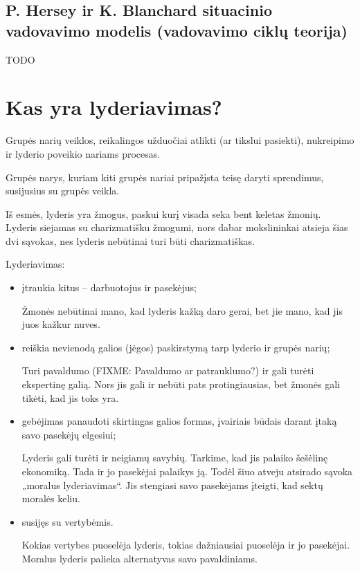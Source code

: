 \subsection{P. Hersey ir K. Blanchard situacinio vadovavimo modelis
(vadovavimo ciklų teorija)}

TODO

\section{Kas yra lyderiavimas?}

\begin{defn}[Lyderiavimas]
  Grupės narių veiklos, reikalingos užduočiai atlikti (ar tikslui pasiekti),
  nukreipimo ir lyderio poveikio nariams procesas.
\end{defn}

\begin{defn}[Lyderis]
  Grupės narys, kuriam kiti grupės nariai pripažįsta teisę daryti
  sprendimus, susijusius su grupės veikla.
\end{defn}

Iš esmės, lyderis yra žmogus, paskui kurį visada seka bent keletas žmonių.
Lyderis siejamas su charizmatišku žmogumi, nors dabar mokslininkai
atsieja šias dvi sąvokas, nes lyderis nebūtinai turi būti charizmatiškas.

Lyderiavimas:
\begin{itemize}
  \item įtraukia kitus – darbuotojus ir pasekėjus;
    \begin{note}
      Žmonės nebūtinai mano, kad lyderis kažką daro gerai, bet jie mano,
      kad jis juos kažkur nuves.
    \end{note}
  \item reiškia nevienodą galios (jėgos) paskirstymą tarp lyderio ir
    grupės narių;
    \begin{note}
      Turi pavaldumo (FIXME: Pavaldumo ar patrauklumo?) ir gali turėti
      ekspertinę galią. Nors jis gali ir nebūti pats protingiausias,
      bet žmonės gali tikėti, kad jis toks yra.
    \end{note}
  \item gebėjimas panaudoti skirtingas galios formas, įvairiais būdais
    darant įtaką savo pasekėjų elgesiui;
    \begin{note}
      Lyderis gali turėti ir neigiamų savybių. Tarkime, kad jis palaiko
      šešėlinę ekonomiką. Tada ir jo pasekėjai palaikys ją. Todėl šiuo
      atveju atsirado sąvoka „moralus lyderiavimas“. Jis stengiasi
      savo pasekėjams įteigti, kad sektų moralės keliu.
    \end{note}
  \item susijęs su vertybėmis.
    \begin{note}
      Kokias vertybes puoselėja lyderis, tokias dažniausiai puoselėja
      ir jo pasekėjai. Moralus lyderis palieka alternatyvas savo
      pavaldiniams.
    \end{note}
\end{itemize}

